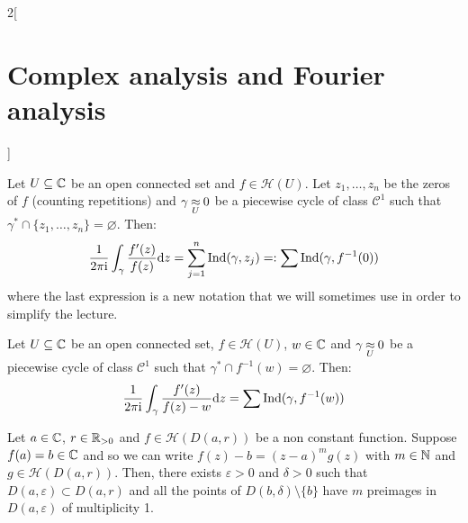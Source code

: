 \documentclass[../../../main.tex]{subfiles}
\begin{document}
\begin{multicols}{2}[\section{Complex analysis and Fourier analysis}]
  \begin{theorem}
    Let $U\subseteq\mathbb{C}$ be an open connected set and $f\in\mathcal{H}(U)$. Let $z_1,\ldots,z_n$ be the zeros of $f$ (counting repetitions) and $\gamma\mathbin{\underset{U}{\approx}} 0$ be a piecewise cycle of class $\mathcal{C}^1$ such that $\gamma^*\cap\{z_1,\ldots,z_n\}=\varnothing$. Then:
    $$\frac{1}{2\pi\mathrm{i}}\int_{\gamma}\frac{f'(z)}{f(z)}\dd z=\sum_{j=1}^n\operatorname{Ind}(\gamma,z_j)=:\sum\operatorname{Ind}(\gamma,f^{-1}(0))$$
    where the last expression is a new notation that we will sometimes use in order to simplify the lecture.
  \end{theorem}
  \begin{corollary}
    Let $U\subseteq\mathbb{C}$ be an open connected set, $f\in\mathcal{H}(U)$, $w\in \mathbb{C}$ and $\gamma\mathbin{\underset{U}{\approx}} 0$ be a piecewise cycle of class $\mathcal{C}^1$ such that $\gamma^*\cap f^{-1}(w)=\varnothing$. Then:
    $$\frac{1}{2\pi\mathrm{i}}\int_{\gamma}\frac{f'(z)}{f(z)-w}\dd z=\sum\operatorname{Ind}(\gamma,f^{-1}(w))$$
  \end{corollary}
  \begin{proposition}
    Let $a\in\mathbb{C}$, $r\in\mathbb{R}_{>0}$ and $f\in\mathcal{H}(D(a,r))$ be a non constant function. Suppose $f(a)=b\in \mathbb{C}$ and so we can write $f(z)-b={(z-a)}^mg(z)$ with $m\in\mathbb{N}$ and $g\in\mathcal{H}(D(a,r))$. Then, there exists $\varepsilon>0$ and $\delta>0$ such that $D(a,\varepsilon)\subset D(a,r)$ and all the points of $D(b,\delta)\setminus\{b\}$ have $m$ preimages in $D(a,\varepsilon)$ of multiplicity 1.
  \end{proposition}
\end{multicols}
\end{document}
